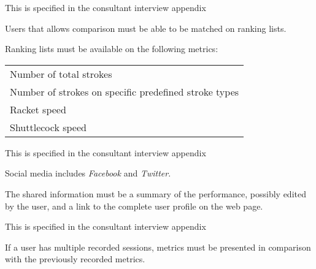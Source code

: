 This  is specified in the consultant interview appendix 

Users that allows comparison must be able to be matched on ranking lists.

Ranking lists must be available on the following metrics: \newline
\begin{tabularx}{\textwidth}{X}
    Number of total strokes \\
    Number of strokes on specific predefined stroke types \\
    Racket speed \\
    Shuttlecock speed \\
\end{tabularx}


This  is specified in the consultant interview appendix 

Social media includes \textit{Facebook} and \textit{Twitter}.

The shared information must be a summary of the performance, possibly edited by the user, and a link to the complete user profile on the web page.


This  is specified in the consultant interview appendix 

If a user has multiple recorded sessions, metrics must be presented in comparison with the previously recorded metrics.
